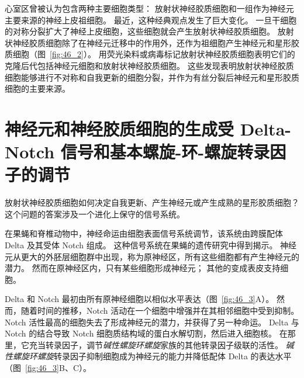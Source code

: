 心室区曾被认为包含两种主要细胞类型：
放射状神经胶质细胞和一组作为神经元主要来源的神经上皮祖细胞。
最近，这种经典观点发生了巨大变化。
一旦干细胞的对称分裂扩大了神经上皮细胞，这些细胞就会产生放射状神经胶质细胞。
放射状神经胶质细胞除了在神经元迁移中的作用外，还作为祖细胞产生神经元和星形胶质细胞（图~\ref{fig:46_2}）。
用荧光染料或病毒标记放射状神经胶质细胞表明它们的克隆后代包括神经元细胞和放射状神经胶质细胞。
这些发现表明放射状神经胶质细胞能够进行不对称和自我更新的细胞分裂，并作为有丝分裂后神经元和星形胶质细胞的主要来源。



\section{神经元和神经胶质细胞的生成受 Delta-Notch 信号和基本螺旋-环-螺旋转录因子的调节}

放射状神经胶质细胞如何决定自我更新、产生神经元或产生成熟的星形胶质细胞？
这个问题的答案涉及一个进化上保守的信号系统。


在果蝇和脊椎动物中，神经命运由细胞表面信号系统调节，该系统由跨膜配体 Delta 及其受体 Notch 组成。
这种信号系统在果蝇的遗传研究中得到揭示。
神经元从更大的外胚层细胞群中出现，称为原神经区，所有这些细胞都有产生神经元的潜力。
然而在原神经区内，只有某些细胞形成神经元；
其他的变成表皮支持细胞。


Delta 和 Notch 最初由所有原神经细胞以相似水平表达（图~\ref{fig:46_3}A）。
然而，随着时间的推移，Notch 活动在一个细胞中增强并在其相邻细胞中受到抑制。
Notch 活性最高的细胞失去了形成神经元的潜力，并获得了另一种命运。
Delta 与 Notch 的结合导致 Notch 细胞质结构域的蛋白水解切割，然后进入细胞核。
在那里，它充当转录因子，调节\textit{碱性螺旋环螺旋}家族的其他转录因子级联的活性。
\textit{碱性螺旋环螺旋}转录因子抑制细胞成为神经元的能力并降低配体 Delta 的表达水平（图~\ref{fig:46_3}B、C）。


